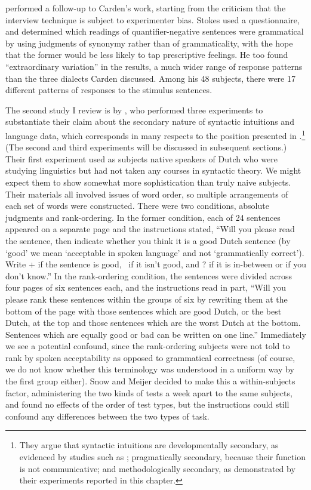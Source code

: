
\citet{Stokes1974} performed  a  follow-up  to  Carden's  work,  starting  from the criticism that the interview technique is subject to experimenter bias. Stokes used a questionnaire, and determined which readings of quantifier-negative sentences were grammatical by using judgments of synonymy rath\-er than of grammaticality, with the hope that the former would be less likely to tap prescriptive feelings. He too found ``extraordinary variation'' in the results, a much wider range of response patterns  than  the  three  dialects  Carden  discussed.  Among his 48 subjects, there were 17 different patterns of responses to the stimulus sentences.

The second study I review is by \citet{SnowEtAl1977}, who performed three experiments to substantiate their claim about the secondary nature of syntactic intuitions and language data, which corresponds in many respects to the position presented in .\footnote{They argue that syntactic intuitions are developmentally secondary, as evidenced by studies such as \citet{Hakes1980}; pragmatically secondary, because their function is not communicative; and methodologically secondary, as demonstrated by their experiments reported in this chapter.}
 (The second and third experiments will be discussed in subsequent sections.) Their first experiment used as subjects native speakers of Dutch who were studying linguistics but had not taken any courses in syntactic theory. We might expect them to show somewhat more sophistication than truly naive subjects. Their materials all involved issues of word order, so multiple arrangements of each set of words were constructed. There were two conditions, absolute judgments and rank-ordering. In the former condition, each of 24 sentences appeared on a separate page and the instructions stated, ``Will you please read the sentence, then indicate whether you think it is a good Dutch sentence (by `good' we mean `acceptable in spoken language' and not `grammatically correct'). Write + if the sentence is good, \textminus~if it isn't good,
and ? if it is in-between or if you don't know.'' In the rank-ordering condition, the sentences were divided across four pages of six sentences each, and the instructions read in part, ``Will you please rank these sentences within the groups of six by rewriting them at the bottom of the page with those sentences which are good Dutch, or the best Dutch, at the top and those sentences which are the worst Dutch at the bottom. Sentences which are equally good or bad can be written on one line.'' Immediately we see a potential confound, since the rank-ordering subjects were not told to rank by spoken acceptability as opposed to grammatical correctness (of course, we do not know whether this terminology was understood in a uniform way by the first group either). Snow and Meijer decided to make this a within-subjects
factor, administering the two kinds of tests a week apart to the same subjects, and found no effects of the order of test types, but the instructions could still confound any differences between the two types of task.

